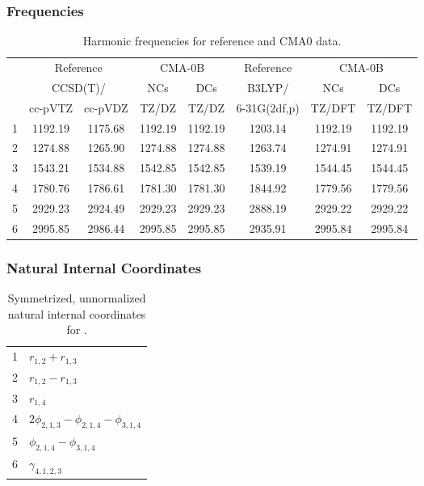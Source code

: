 \documentclass[10pt,oneside]{article}
\begin{document}
\clearpage

\subsubsection*{Frequencies}
\begin{table}[h!]
\centering
\caption{Harmonic frequencies for reference and CMA0 data.}
\begin{tabular}{cccccccc}
\toprule
{} & \multicolumn{2}{c}{Reference} & \multicolumn{2}{c}{CMA-0B} &    Reference & \multicolumn{2}{c}{CMA-0B} \\
{} & \multicolumn{2}{c}{CCSD(T)/} &     NCs &     DCs &       B3LYP/ &     NCs &     DCs \\
{} &   cc-pVTZ & cc-pVDZ &   TZ/DZ &   TZ/DZ & 6-31G(2df,p) &  TZ/DFT &  TZ/DFT \\
\midrule
1 &   1192.19 & 1175.68 & 1192.19 & 1192.19 &      1203.14 & 1192.19 & 1192.19 \\
2 &   1274.88 & 1265.90 & 1274.88 & 1274.88 &      1263.74 & 1274.91 & 1274.91 \\
3 &   1543.21 & 1534.88 & 1542.85 & 1542.85 &      1539.19 & 1544.45 & 1544.45 \\
4 &   1780.76 & 1786.61 & 1781.30 & 1781.30 &      1844.92 & 1779.56 & 1779.56 \\
5 &   2929.23 & 2924.49 & 2929.23 & 2929.23 &      2888.19 & 2929.22 & 2929.22 \\
6 &   2995.85 & 2986.44 & 2995.85 & 2995.85 &      2935.91 & 2995.84 & 2995.84 \\
\bottomrule
\end{tabular}
\end{table}

\clearpage

\subsubsection*{Natural Internal Coordinates}
\begin{table}[h!]
\centering
\caption{Symmetrized, unnormalized natural internal coordinates for .}
\small
\begin{tabular}{ll}
  1   & $r_{1,2} + r_{1,3}$ \\
  2   & $r_{1,2} - r_{1,3}$ \\
  3   & $r_{1,4}$ \\
  4   & $2\phi_{2,1,3} - \phi_{2,1,4} - \phi_{3,1,4}$ \\
  5   & $\phi_{2,1,4} - \phi_{3,1,4}$ \\
  6   & $\gamma_{4,1,2,3}$ \\
\end{tabular}
\end{table}
\end{document}
